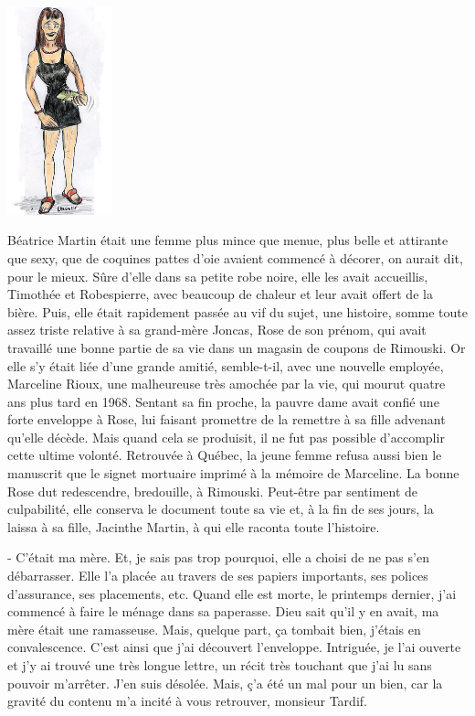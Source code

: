 \begin{floatingfigure}[l]{40mm}
\includegraphics[height=60mm]{corps/chapitre9/img/personnage-beatrice.jpg}
\end{floatingfigure}

Béatrice Martin était une femme plus mince que menue, plus belle et attirante que sexy, que de coquines pattes d’oie avaient commencé à décorer, on aurait dit, pour le mieux. Sûre d’elle dans sa petite robe noire, elle les avait accueillis, Timothée et Robespierre, avec beaucoup de chaleur et leur avait offert de la bière. Puis, elle était rapidement passée au vif du sujet, une histoire, somme toute assez triste relative à sa grand-mère Joncas, Rose de son prénom, qui avait travaillé une bonne partie de sa vie dans un magasin de coupons de Rimouski. Or elle s’y était liée d’une grande amitié, semble-t-il, avec une nouvelle employée, Marceline Rioux, une malheureuse très amochée par la vie, qui mourut quatre ans plus tard en 1968. Sentant sa fin proche, la pauvre dame avait confié une forte enveloppe à Rose, lui faisant promettre de la remettre à sa fille advenant qu’elle décède. Mais quand cela se produisit, il ne fut pas possible d’accomplir cette ultime volonté. Retrouvée à Québec, la jeune femme refusa aussi bien le manuscrit que le signet mortuaire imprimé à la mémoire de Marceline. La bonne Rose dut redescendre, bredouille, à Rimouski. Peut-être par sentiment de culpabilité, elle conserva le document toute sa vie et, à la fin de ses jours, la laissa à sa fille, Jacinthe Martin, à qui elle raconta toute l’histoire.

- C’était ma mère. Et, je sais pas trop pourquoi, elle a choisi de ne pas s’en débarrasser. Elle l’a placée au travers de ses papiers importants, ses polices d’assurance, ses placements, etc. Quand elle est morte, le printemps dernier, j’ai commencé à faire le ménage dans sa paperasse. Dieu sait qu’il y en avait, ma mère était une ramasseuse. Mais, quelque part, ça tombait bien, j’étais en convalescence. C’est ainsi que j’ai découvert l’enveloppe. Intriguée, je l’ai ouverte et j’y ai trouvé une très longue lettre, un récit très touchant que j’ai lu sans pouvoir m’arrêter. J’en suis désolée. Mais, ç’a été un mal pour un bien, car la gravité du contenu m’a incité à vous retrouver, monsieur Tardif.

